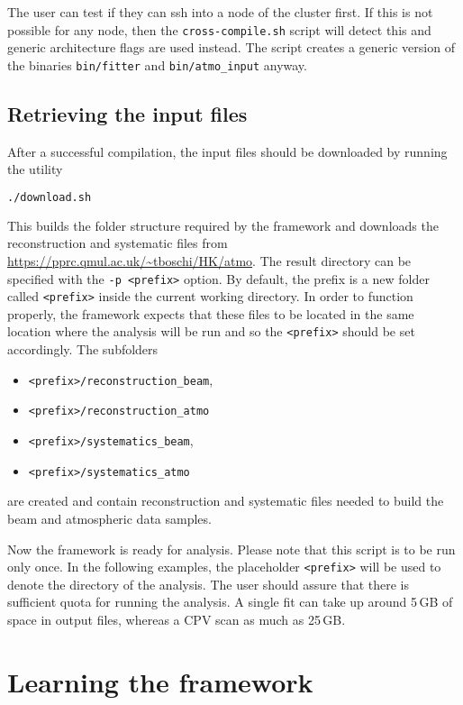 \documentclass[a4paper, 11pt]{article}
\begin{document}
The user can test if they can ssh into a node of the cluster first.
If this is not possible for any node, then the \texttt{cross-compile.sh} script will detect this and generic architecture flags are used instead.
The script creates a generic version of the binaries \texttt{bin/fitter} and \texttt{bin/atmo\_input} anyway.

\subsection{Retrieving the input files}
\label{sec:download}

After a successful compilation, the input files should be downloaded by running the utility
\begin{lstlisting}[language=bash]
	./download.sh
\end{lstlisting}
This builds the folder structure required by the framework and downloads the reconstruction %
and systematic files from \url{https://pprc.qmul.ac.uk/~tboschi/HK/atmo}.
The result directory can be specified with the \texttt{-p <prefix>} option.
By default, the prefix is a new folder called \texttt{<prefix>} inside the current working directory.
In order to function properly, the framework expects that these files to be located in the same %
location where the analysis will be run and so the \texttt{<prefix>} should be set accordingly.
The subfolders
\begin{itemize}
		\small
	\item \texttt{<prefix>/reconstruction\_beam},
	\item \texttt{<prefix>/reconstruction\_atmo}
	\item \texttt{<prefix>/systematics\_beam},
	\item \texttt{<prefix>/systematics\_atmo}
\end{itemize}
are created and contain reconstruction and systematic files %
needed to build the beam and atmospheric data samples.

Now the framework is ready for analysis. Please note that this script is to be run only once.
In the following examples, the placeholder \texttt{<prefix>} will be used %
to denote the directory of the analysis.
The user should assure that there is sufficient quota for running the analysis.
A single fit can take up around 5\,GB of space in output files, whereas a CPV scan %
as much as 25\,GB.

\section{Learning the framework}
\end{document}
